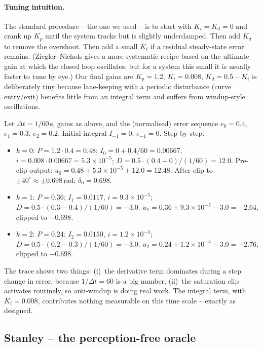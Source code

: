 \paragraph{Tuning intuition.}
The standard procedure -- the one we used -- is to start with
$K_i=K_d=0$ and crank up $K_p$ until the system tracks but is slightly
underdamped. Then add $K_d$ to remove the overshoot. Then add a small
$K_i$ if a residual steady-state error remains. (Ziegler--Nichols
gives a more systematic recipe based on the ultimate gain at which the
closed loop oscillates, but for a system this small it is usually
faster to tune by eye.) Our final gains are $K_p=1.2$, $K_i=0.008$,
$K_d=0.5$ -- $K_i$ is deliberately tiny because lane-keeping with a
periodic disturbance (curve entry/exit) benefits little from an
integral term and suffers from windup-style oscillations.

\begin{example}
Let $\Delta t=1/60$\,s, gains as above, and the (normalised) error
sequence $e_0=0.4$, $e_1=0.3$, $e_2=0.2$. Initial integral $I_{-1}=0$,
$e_{-1}=0$. Step by step:
\begin{itemize}[leftmargin=1.4em,itemsep=2pt]
  \item $k=0$: $P=1.2\cdot 0.4 = 0.48$; $I_0 = 0 + 0.4/60 = 0.00667$,
        $i=0.008\cdot 0.00667 = 5.3\times 10^{-5}$;
        $D = 0.5\cdot(0.4-0)/(1/60) = 12.0$. Pre-clip output:
        $u_0 = 0.48 + 5.3\times 10^{-5} + 12.0 = 12.48$. After clip to
        $\pm 40^\circ \approx \pm 0.698$\,rad: $\delta_0 = 0.698$.
  \item $k=1$: $P=0.36$; $I_1=0.0117$, $i=9.3\times 10^{-5}$;
        $D=0.5\cdot(0.3-0.4)/(1/60) = -3.0$.
        $u_1 = 0.36 + 9.3\times 10^{-5} - 3.0 = -2.64$, clipped to
        $-0.698$.
  \item $k=2$: $P=0.24$; $I_2=0.0150$, $i=1.2\times 10^{-4}$;
        $D=0.5\cdot(0.2-0.3)/(1/60) = -3.0$.
        $u_2 = 0.24 + 1.2\times 10^{-4} - 3.0 = -2.76$, clipped to
        $-0.698$.
\end{itemize}
The trace shows two things: (i)~the derivative term dominates during
a step change in error, because $1/\Delta t = 60$ is a big number;
(ii)~the saturation clip activates routinely, so anti-windup is doing
real work. The integral term, with $K_i=0.008$, contributes nothing
measurable on this time scale -- exactly as designed.
\end{example}

\subsection{Stanley -- the perception-free oracle}

